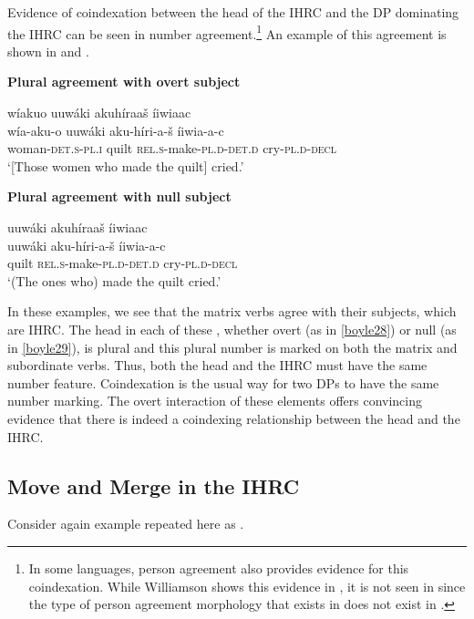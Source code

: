 \documentclass[output=paper]{LSP/langsci}
\begin{document}
Evidence of coindexation between the head of the IHRC and the DP dominating the IHRC can be seen in number agreement.\footnote{In some languages, person agreement also provides evidence for this coindexation. While Williamson shows this evidence in , it is not seen in  since the type of person agreement morphology that exists in  does not exist in .}  An example of this agreement is shown in  and .

\ea \textbf{Plural agreement with overt subject} \label{boyle28}

\glll w\'iakuo uuw\'aki akuh\'iraa\v{s} \'iiwiaac\\
w\'ia-aku-o  uuw\'aki aku-h\'iri-a-\v{s}    \'iiwia-a-c\\
woman-\textsc{det.s-pl.i}  quilt  \textsc{rel.s}-make-\textsc{pl.d-det.d} cry-\textsc{pl.d-decl}\\
\trans `[Those women who made the quilt] cried.'
\z

\ea \textbf{Plural agreement with null subject} \label{boyle29}

\glll uuw\'aki akuh\'iraa\v{s} \'iiwiaac\\
uuw\'aki aku-h\'iri-a-\v{s}   \'iiwia-a-c\\
quilt     \textsc{rel.s}-make-\textsc{pl.d}-\textsc{det.d} cry-\textsc{pl.d-decl}\\
\trans `(The ones who) made the quilt cried.'	
\z

In these examples, we see that the matrix verbs agree with their subjects, which are IHRC. The head in each of these , whether overt (as in \ref{boyle28}) or null (as in \ref{boyle29}), is plural and this plural number is marked on both the matrix and subordinate verbs. Thus, both the head and the IHRC must have the same number feature. Coindexation is the usual way for two DPs to have the same number marking. The overt interaction of these elements offers convincing evidence that there is indeed a coindexing relationship between the head and the IHRC.  
	
\subsection{Move and Merge in the  IHRC}\label{sec:boyle:5.4}

Consider again example  repeated here as .
\end{document}
